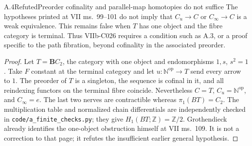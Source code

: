 \begin{result}{A.4}{Refuted}{Preorder cofinality and parallel-map homotopies do not suffice}
The hypotheses printed at VII ms.~99--101 do not imply that
$C_u\to C$ or $C_\infty\to C$ is a weak equivalence. This remains false
when $T$ has one object and the fibre category is terminal. Thus
VIIb-C026 requires a condition such as A.3, or a proof specific to the
path fibration, beyond cofinality in the associated preorder.
\end{result}
\begin{proof}
Let $T=\mathbf B C_2$, the category with one object and endomorphisms
$1,s$, $s^2=1$.
Take $F$ constant at the terminal category and let
$u:\mathbb N^{\mathrm{op}}\to T$ send every arrow to $1$.
The preorder of $T$ is a singleton, the sequence is cofinal in it,
and all reindexing functors on the terminal fibre coincide.
Nevertheless $C=T$, $C_u=\mathbb N^{\mathrm{op}}$, and
$C_\infty=e$. The last two nerves are contractible whereas
$\pi_1(BT)=C_2$. The multiplication table and normalized chain
differentials are independently checked in
\texttt{code/a\_finite\_checks.py}; they give $H_1(BT;\mathbb Z)=\mathbb Z/2$.
Grothendieck already identifies the one-object obstruction himself at
VII ms.~109. It is not a correction to that page; it refutes the
insufficient earlier general hypothesis.
\end{proof}

